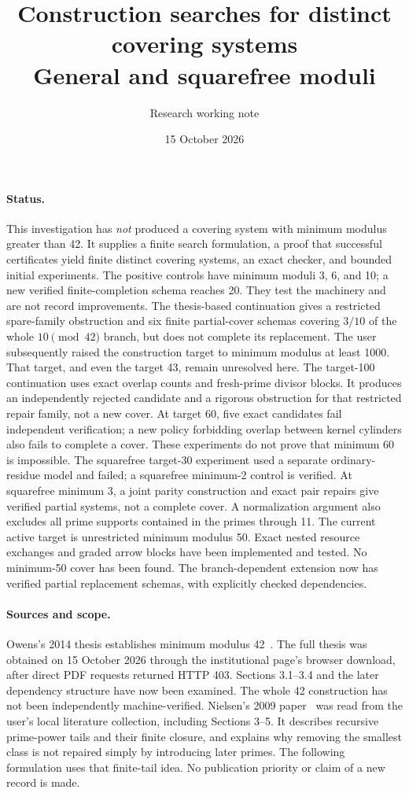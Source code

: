 \documentclass[11pt]{article}
\title{Construction searches for distinct covering systems\\General and squarefree moduli}
\author{Research working note}
\date{15 October 2026}
\begin{document}
\maketitle

\paragraph{Status.}
This investigation has \emph{not} produced a covering system with minimum
modulus greater than 42. It supplies a finite search formulation, a proof
that successful certificates yield finite distinct covering systems, an exact
checker, and bounded initial experiments. The positive controls have minimum
moduli 3, 6, and 10; a new verified finite-completion schema reaches 20.
They test the machinery and are not record improvements.
The thesis-based continuation gives a restricted spare-family obstruction
and six finite partial-cover schemas covering $3/10$ of the whole
$10\pmod{42}$ branch, but does not complete its replacement.
The user subsequently raised the construction target to minimum modulus
at least 1000. That target, and even the target 43, remain unresolved here.
The target-100 continuation uses exact overlap counts and
fresh-prime divisor blocks. It produces an independently rejected candidate
and a rigorous obstruction for that restricted repair family, not a new cover.
At target 60, five exact candidates fail independent verification;
a new policy forbidding overlap between kernel cylinders also fails to
complete a cover. These experiments do not prove that minimum 60 is impossible.
The squarefree target-30 experiment used a separate ordinary-residue model
and failed; a squarefree minimum-2 control is verified. At squarefree minimum
3, a joint parity construction and exact pair repairs
give verified partial systems, not a complete cover. A normalization argument
also excludes all prime supports contained in the primes through 11.
The current active target is unrestricted minimum modulus 50. Exact nested
resource exchanges and graded arrow blocks have been implemented and tested.
No minimum-50 cover has been found. The branch-dependent extension now has
verified partial replacement schemas, with explicitly checked dependencies.

\paragraph{Sources and scope.}
Owens's 2014 thesis establishes minimum modulus 42~\cite{owens}.
The full thesis was obtained on 15 October 2026 through the institutional
page's browser download, after direct PDF requests returned HTTP 403.
Sections 3.1--3.4 and the later dependency structure have now been examined.
The whole 42 construction has not been independently machine-verified.
Nielsen's 2009 paper~\cite{nielsen} was read
from the user's local literature collection, including Sections 3--5.
It describes recursive prime-power tails and their finite closure, and explains
why removing the smallest class is not repaired simply by introducing later
primes. The following formulation uses that finite-tail idea. No publication
priority or claim of a new record is made.
\end{document}
